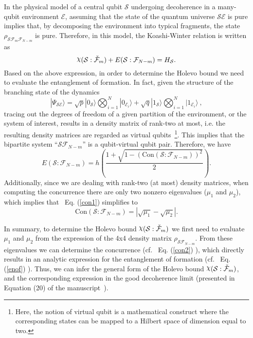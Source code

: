 \documentclass[aps,prl,showpacs,amsmath,amssymb,amsfonts,lengthcheck,onecolumn,longbibliography,superscriptaddress]{revtex4-2}
\newcommand\myeqref[1]{
	Eq. (\textup{\ref{#1}})
}
\newcommand{\ket}[1]    {| #1 \rangle}
\newcommand{\cS}        {{\mathcal S}}
\newcommand{\cE}        {{\mathcal E}}
\newcommand{\+}         {\dagger}
\DeclareRobustCommand{\rchi}{{\mathpalette\irchi\relax}}
\newcommand{\irchi}[2]{\raisebox{\depth}{$#1\chi$}}
\newcommand{\mc}[1]{\mathcal{#1}}
\begin{document}
In the physical model of a central qubit $\cS$ undergoing decoherence in a many-qubit environment $\cE$, assuming that the state of the quantum universe $\mc{S}\mc{E}$ is pure implies that, by decomposing the environment into typical fragments, the state $\rho_{\mc{S}\mc{F}_m\mc{F}_{N-m}}$ is pure. Therefore, in this model, the Koashi-Winter relation is written as
\begin{equation}
	\rchi(\mc{S}:\check{\mc{F}}_m)+E(\mc{S}:\mc{F}_{N-m})=H_{\mc{S}}.
	\label{kwm}
\end{equation}
Based on the above expression, in order to determine the Holevo bound we need to evaluate the entanglement of formation. In fact, given the structure of the branching state of the dynamics~\cite{darwint1}
\begin{equation}
	| \Psi_\mathcal{SE} \rangle= \sqrt{p}  \ket { 0_\mathcal{S}} \bigotimes_{i=1}^{N} \ket { 0_{\cE_{i}}} + \sqrt{q} | 1 _\mathcal{S}\rangle \bigotimes_{i=1}^{N} \ket { 1_{\mathcal{E}_i}} \ ,
\end{equation}
tracing out the degrees of freedom of a given partition of the environment, or the system of interest, results in a density matrix of rank-two at most, i.e. the resulting density matrices are regarded as virtual qubits~\footnote{Here, the notion of virtual qubit is a mathematical construct where the corresponding states can be mapped to a Hilbert space of dimension equal to two.}. This implies that the bipartite system ``$\mc{S}\mc{F}_{N-m}$'' is a qubit-virtual qubit pair. Therefore, we have
\begin{equation}
	E\left(\mc{S}:\mc{F}_{N-m}\right)=h\left(\frac{1+\sqrt{1-\left(\mathrm{Con}\left(\mc{S}:\mc{F}_{N-m}\right)\right)^{2}}}{2}\right).
	\label{enof}
\end{equation}
Additionally, since we are dealing with rank-two (at most) density matrices, when computing the concurrence there are only two nonzero eigenvalues ($\mu_1$ and $\mu_2$), which implies that~\myeqref{con1} simplifies to
\begin{equation}
	\mathrm{Con}\left(\mc{S}:\mc{F}_{N-m}\right)=|\sqrt{\mu_1}-\sqrt{\mu_2}|.
	\label{con2}
\end{equation}

In summary, to determine the Holevo bound $\rchi(\mc{S}:\check{\mc{F}}_m)$ we first need to evaluate $\mu_1$ and $\mu_2$ from the expression of the 4x4 density matrix $\rho_{\mc{S}\mc{F}_{N-m}}$. From these eigenvalues we can determine the concurrence (cf.~\myeqref{con2}), which directly results in an analytic expression for the entanglement of formation (cf.~\myeqref{enof}). Thus, we can infer the general form of the Holevo bound $\rchi(\mc{S}:\check{\mc{F}}_m)$, and the corresponding expression in the good decoherence limit (presented in Equation (20) of the manuscript~\cite{darwint1}).
\end{document}
